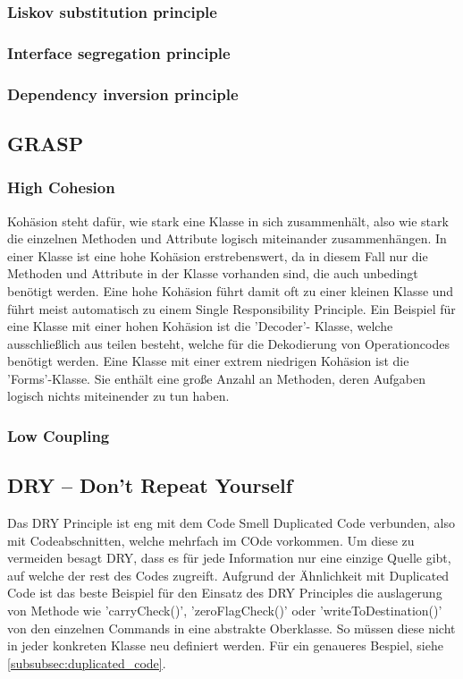 \documentclass[12pt,a4paper,titlepage,ngerman,pdftex]{report}
\begin{document}
    \subsubsection{Liskov substitution principle}

    \subsubsection{Interface segregation principle}

    \subsubsection{Dependency inversion principle}

    \subsection{GRASP}

    \subsubsection{High Cohesion}

    Kohäsion steht dafür, wie stark eine Klasse in sich zusammenhält, also wie stark die einzelnen Methoden und Attribute logisch miteinander zusammenhängen. In einer Klasse ist eine hohe Kohäsion erstrebenswert, da in diesem Fall nur die Methoden und Attribute in der Klasse vorhanden sind, die auch unbedingt benötigt werden.
    Eine hohe Kohäsion führt damit oft zu einer kleinen Klasse und führt meist automatisch zu einem Single Responsibility Principle. Ein Beispiel für eine Klasse mit einer hohen Kohäsion ist die 'Decoder'- Klasse, welche ausschließlich aus teilen besteht, welche für die Dekodierung von Operationcodes benötigt werden. 
    Eine Klasse mit einer extrem niedrigen Kohäsion ist die 'Forms'-Klasse. Sie enthält eine große Anzahl an Methoden, deren Aufgaben logisch nichts miteinender zu tun haben.  

    \subsubsection{Low Coupling}
    
    \subsection{DRY -- Don't Repeat Yourself}
    Das DRY Principle ist eng mit dem Code Smell Duplicated Code verbunden, also mit Codeabschnitten, welche mehrfach im COde vorkommen. Um diese zu vermeiden besagt DRY, dass es für jede Information nur eine einzige Quelle gibt, auf welche der rest des Codes zugreift.
    Aufgrund der Ähnlichkeit mit Duplicated Code ist das beste Beispiel für den Einsatz des DRY Principles die auslagerung von Methode wie 'carryCheck()', 'zeroFlagCheck()' oder 'writeToDestination()' von den einzelnen Commands in eine abstrakte Oberklasse. So müssen diese nicht in jeder konkreten Klasse neu definiert werden. Für ein genaueres Bespiel, siehe \autoref{subsubsec:duplicated_code}.  
\end{document}
